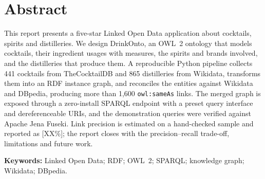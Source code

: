 \section*{Abstract}

This report presents a five-star Linked Open Data application about cocktails,
spirits and distilleries. We design DrinkOnto, an OWL~2 ontology that models
cocktails, their ingredient usages with measures, the spirits and brands
involved, and the distilleries that produce them. A reproducible Python
pipeline collects 441 cocktails from TheCocktailDB and 865 distilleries from
Wikidata, transforms them into an RDF instance graph, and reconciles the
entities against Wikidata and DBpedia, producing more than 1{,}600
\texttt{owl:sameAs} links. The merged graph is exposed through a zero-install
SPARQL endpoint with a preset query interface and dereferenceable URIs, and the
demonstration queries were verified against Apache Jena Fuseki. Link precision
is estimated on a hand-checked sample and reported as [XX\%]; the report closes
with the precision--recall trade-off, limitations and future work.

\noindent\textbf{Keywords:} Linked Open Data; RDF; OWL~2; SPARQL; knowledge
graph; Wikidata; DBpedia.
